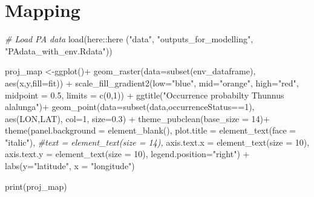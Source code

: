 \documentclass[
]{book}
\newenvironment{Shaded}{\begin{snugshade}}{\end{snugshade}}
\newcommand{\AttributeTok}[1]{\textcolor[rgb]{0.77,0.63,0.00}{#1}}
\newcommand{\CommentTok}[1]{\textcolor[rgb]{0.56,0.35,0.01}{\textit{#1}}}
\newcommand{\DecValTok}[1]{\textcolor[rgb]{0.00,0.00,0.81}{#1}}
\newcommand{\FloatTok}[1]{\textcolor[rgb]{0.00,0.00,0.81}{#1}}
\newcommand{\FunctionTok}[1]{\textcolor[rgb]{0.00,0.00,0.00}{#1}}
\newcommand{\NormalTok}[1]{#1}
\newcommand{\OtherTok}[1]{\textcolor[rgb]{0.56,0.35,0.01}{#1}}
\newcommand{\SpecialCharTok}[1]{\textcolor[rgb]{0.00,0.00,0.00}{#1}}
\newcommand{\StringTok}[1]{\textcolor[rgb]{0.31,0.60,0.02}{#1}}
\begin{document}
\hypertarget{mapping}{%
\section{Mapping}\label{mapping}}

\begin{Shaded}
\begin{Highlighting}[]
\CommentTok{\# Load PA data}
\FunctionTok{load}\NormalTok{(here}\SpecialCharTok{::}\FunctionTok{here}\NormalTok{ (}\StringTok{"data"}\NormalTok{, }\StringTok{"outputs\_for\_modelling"}\NormalTok{, }\StringTok{"PAdata\_with\_env.Rdata"}\NormalTok{))}


\NormalTok{proj\_map }\OtherTok{\textless{}{-}}\FunctionTok{ggplot}\NormalTok{()}\SpecialCharTok{+}
  \FunctionTok{geom\_raster}\NormalTok{(}\AttributeTok{data=}\FunctionTok{subset}\NormalTok{(env\_dataframe),}
              \FunctionTok{aes}\NormalTok{(x,y,}\AttributeTok{fill=}\NormalTok{fit)) }\SpecialCharTok{+}
  \FunctionTok{scale\_fill\_gradient2}\NormalTok{(}\AttributeTok{low=}\StringTok{"blue"}\NormalTok{, }
                       \AttributeTok{mid=}\StringTok{"orange"}\NormalTok{,}
                       \AttributeTok{high=}\StringTok{"red"}\NormalTok{,}
                       \AttributeTok{midpoint =} \FloatTok{0.5}\NormalTok{,}
                       \AttributeTok{limits =} \FunctionTok{c}\NormalTok{(}\DecValTok{0}\NormalTok{,}\DecValTok{1}\NormalTok{)) }\SpecialCharTok{+}
  \FunctionTok{ggtitle}\NormalTok{(}\StringTok{"Occurrence probabilty Thunnus alalunga"}\NormalTok{)}\SpecialCharTok{+} 
  \FunctionTok{geom\_point}\NormalTok{(}\AttributeTok{data=}\FunctionTok{subset}\NormalTok{(data,occurrenceStatus}\SpecialCharTok{==}\DecValTok{1}\NormalTok{),}
             \FunctionTok{aes}\NormalTok{(LON,LAT),}
             \AttributeTok{col=}\DecValTok{1}\NormalTok{,}
             \AttributeTok{size=}\FloatTok{0.3}\NormalTok{) }\SpecialCharTok{+}
  \FunctionTok{theme\_pubclean}\NormalTok{(}\AttributeTok{base\_size =} \DecValTok{14}\NormalTok{)}\SpecialCharTok{+}
  \FunctionTok{theme}\NormalTok{(}\AttributeTok{panel.background =} \FunctionTok{element\_blank}\NormalTok{(),}
        \AttributeTok{plot.title =} \FunctionTok{element\_text}\NormalTok{(}\AttributeTok{face =} \StringTok{"italic"}\NormalTok{), }
        \CommentTok{\#text = element\_text(size = 14), }
        \AttributeTok{axis.text.x =} \FunctionTok{element\_text}\NormalTok{(}\AttributeTok{size =} \DecValTok{10}\NormalTok{),}
        \AttributeTok{axis.text.y =} \FunctionTok{element\_text}\NormalTok{(}\AttributeTok{size =} \DecValTok{10}\NormalTok{),}
        \AttributeTok{legend.position=}\StringTok{"right"}\NormalTok{) }\SpecialCharTok{+}
  \FunctionTok{labs}\NormalTok{(}\AttributeTok{y=}\StringTok{"latitude"}\NormalTok{, }\AttributeTok{x =} \StringTok{"longitude"}\NormalTok{)}
  
\FunctionTok{print}\NormalTok{(proj\_map)}
\end{Highlighting}
\end{Shaded}
\end{document}
